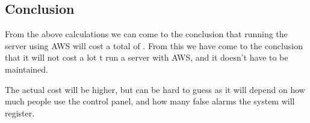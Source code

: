 \subsection{Conclusion}
From the above calculations we can come to the conclusion that running the server using AWS will cost a total of . From this we have come to the conclusion that it will not cost a lot t run a server with AWS, and it doesn't have to be maintained.

The actual cost will be higher, but can be hard to guess as it will depend on how much people use the control panel, and how many false alarms the system will register. 

\fi
